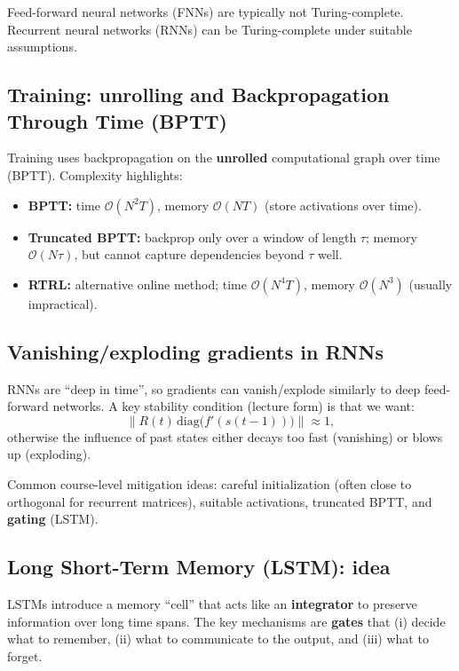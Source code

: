 \documentclass[11pt, oneside]{book}
\newcommand{\1}{\ind}                       %
\begin{document}
\begin{notebox}[title={Turing Completeness: FNN vs.\ RNN}]
Feed-forward neural networks (FNNs) are typically not Turing-complete.
Recurrent neural networks (RNNs) can be Turing-complete under suitable assumptions.
\end{notebox}

\subsection{Training: unrolling and Backpropagation Through Time (BPTT)}
Training uses backpropagation on the \textbf{unrolled} computational graph over time (BPTT). Complexity highlights:
\begin{itemize}
  \item \textbf{BPTT:} time $\mathcal{O}(N^2T)$, memory $\mathcal{O}(NT)$ (store activations over time).
  \item \textbf{Truncated BPTT:} backprop only over a window of length $\tau$; memory $\mathcal{O}(N\tau)$, but cannot capture dependencies beyond $\tau$ well.
  \item \textbf{RTRL:} alternative online method; time $\mathcal{O}(N^4T)$, memory $\mathcal{O}(N^3)$ (usually impractical).
\end{itemize}

\subsection{Vanishing/exploding gradients in RNNs}
RNNs are ``deep in time'', so gradients can vanish/explode similarly to deep feed-forward networks.
A key stability condition (lecture form) is that we want:
\[
\big\| R(t)\,\mathrm{diag}\big(f'(s(t-1))\big)\big\| \approx 1,
\]
otherwise the influence of past states either decays too fast (vanishing) or blows up (exploding).

Common course-level mitigation ideas: careful initialization (often close to orthogonal for recurrent matrices), suitable activations, truncated BPTT, and \textbf{gating} (LSTM).

\subsection{Long Short-Term Memory (LSTM): idea}
LSTMs introduce a memory ``cell'' that acts like an \textbf{integrator} to preserve information over long time spans.
The key mechanisms are \textbf{gates} that (i) decide what to remember, (ii) what to communicate to the output, and (iii) what to forget.
\end{document}
